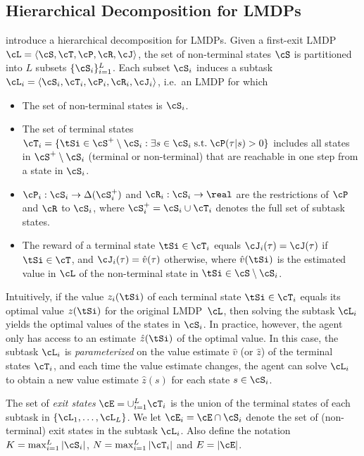 \subsection{Hierarchical Decomposition for LMDPs}

\citet{Infante2022} introduce a hierarchical decomposition for LMDPs. Given a first-exit LMDP ${\cL=\langle\cS,\cT,\cP,\cR,\cJ\rangle}$, the set of non-terminal states $\cS$ is partitioned into $L$ subsets $\{\cS_i\}_{i=1}^L$. Each subset $\cS_i$ induces a subtask $\cL_i=\langle\cS_i,\cT_i,\cP_i,\cR_i,\cJ_i\rangle$, i.e.~an LMDP for which
\begin{itemize}
  \item The set of non-terminal states is $\cS_i$.
  \item The set of terminal states $\cT_i=\{\tSi \in\cS^+\setminus\cS_i:\exists s\in \cS_i \; \text{s.t.} \; \cP(\tau|s)>0\}$ includes all states in $\cS^+\setminus\cS_i$ (terminal or non-terminal) that are reachable in one step from a state in $\cS_i$.
  \item $\cP_i:\cS_i\rightarrow\Delta(\cS_i^+)$ and $\cR_i:\cS_i\rightarrow\real$ are the restrictions of $\cP$ and $\cR$ to $\cS_i$, where $\cS_i^+=\cS_i\cup\cT_i$ denotes the full set of subtask states.
  \item The reward of a terminal state $\tSi \in\cT_i$ equals $\cJ_i(\tau)=\cJ(\tau)$ if $\tSi\in\cT$, and $\cJ_i(\tau)=\hat{v}(\tau)$ otherwise, where $\hat{v}(\tSi)$ is the estimated value in $\cL$ of the non-terminal state in  $\tSi\in\cS \setminus \cS_i$.
\end{itemize}

Intuitively, if the value $z_i(\tSi)$ of each terminal state $\tSi\in\cT_i$ equals its optimal value $z(\tSi)$ for the original LMDP~$\cL$, then solving the subtask $\cL_i$ yields the optimal values of the states in $\cS_i$.
In practice, however, the agent only has access to an estimate $\hat{z}(\tSi)$ of the optimal value.
In this case, the subtask $\cL_i$ is {\em parameterized} on the value estimate $\hat{v}$ (or $\hat{z}$) of the terminal states $\cT_i$, and each time the value estimate changes, the agent can solve $\cL_i$ to obtain a new value estimate
$\hat{z}(s)$ for each state $s\in\cS_i$.

The set of {\em exit states} $\cE=\cup_{i=1}^L\cT_i$ is the union of the terminal states of each subtask in $\{\cL_1,\ldots,\cL_L\}$. We let $\cE_i=\cE\cap\cS_i$ denote the set of (non-terminal) exit states in the subtask $\cL_i$. Also define the notation $K=\max_{i=1}^L|\cS_i|$, $N=\max_{i=1}^L|\cT_i|$ and $E=|\cE|$.

